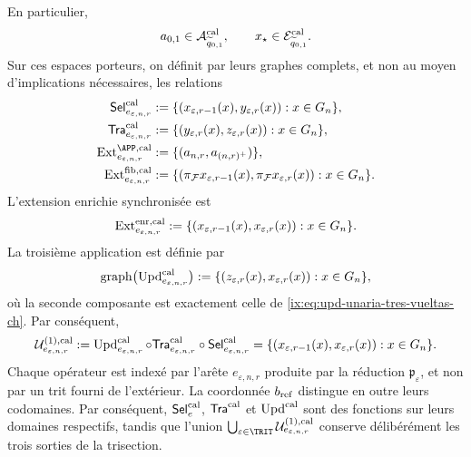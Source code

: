 En particulier,
\[
 a_{0,1}\in\mathcal A^{\rm cal}_{\widetilde q_{0,1}},
 \qquad
 x_\star\in\mathcal E^{\rm cal}_{\widetilde q_{0,1}}.
\]
Sur ces espaces porteurs, on définit par leurs graphes complets, et non au moyen d'implications nécessaires, les relations
\begin{align}
 \mathsf{Sel}^{\rm cal}_{e_{\varepsilon,n,r}}
   &:=\{(x_{\varepsilon,r-1}(x),y_{\varepsilon,r}(x)):
          x\in G_n\},\\
 \mathsf{Tra}^{\rm cal}_{e_{\varepsilon,n,r}}
   &:=\{(y_{\varepsilon,r}(x),z_{\varepsilon,r}(x)):
          x\in G_n\},\\
 \operatorname{Ext}^{\APP,\rm cal}_{e_{\varepsilon,n,r}}
   &:=\{(a_{n,r},a_{(n,r)^+})\},
 \label{ix:eq:ext-app-calibrada-ch}\\
 \operatorname{Ext}^{\rm fib,cal}_{e_{\varepsilon,n,r}}
   &:=\{(\pi_{\mathcal F}x_{\varepsilon,r-1}(x),
          \pi_{\mathcal F}x_{\varepsilon,r}(x)):x\in G_n\}.
 \label{ix:eq:ext-fibra-calibrada-ch}
\end{align}
L'extension enrichie synchronisée est
\begin{equation}
 \operatorname{Ext}^{\rm enr,cal}_{e_{\varepsilon,n,r}}
 :=\{(x_{\varepsilon,r-1}(x),x_{\varepsilon,r}(x)):
       x\in G_n\}.
 \label{ix:eq:ext-enriquecida-calibrada-ch}
\end{equation}
La troisième application est définie par
\begin{equation}
 \operatorname{graph}
 \bigl(\operatorname{Upd}^{\rm cal}_{e_{\varepsilon,n,r}}\bigr)
 :=\{(z_{\varepsilon,r}(x),x_{\varepsilon,r}(x)):
       x\in G_n\},
 \label{ix:eq:grafo-upd-calibrado-ch}
\end{equation}
où la seconde composante est exactement celle de
\eqref{ix:eq:upd-unaria-tres-vueltas-ch}. Par conséquent,
\begin{equation}
 \mathcal U^{(1),\rm cal}_{e_{\varepsilon,n,r}}
 :=\operatorname{Upd}^{\rm cal}_{e_{\varepsilon,n,r}}\circ
   \mathsf{Tra}^{\rm cal}_{e_{\varepsilon,n,r}}\circ
   \mathsf{Sel}^{\rm cal}_{e_{\varepsilon,n,r}}
 =\{(x_{\varepsilon,r-1}(x),x_{\varepsilon,r}(x)):
      x\in G_n\}.
 \label{ix:eq:transicion-cal-en-tpk-ch}
\end{equation}
Chaque opérateur est indexé par l’arête
\(e_{\varepsilon,n,r}\) produite par la réduction
\(\mathfrak p_\varepsilon\), et non par un trit fourni de l’extérieur. La
coordonnée \(b_{\rm ref}\) distingue en outre leurs codomaines. Par conséquent,
\(\mathsf{Sel}^{\rm cal}_{e}\),
\(\mathsf{Tra}^{\rm cal}\) et \(\operatorname{Upd}^{\rm cal}\) sont des fonctions
sur leurs domaines respectifs, tandis que
l’union
\(\bigcup_{\varepsilon\in\TRIT}
\mathcal U^{(1),\rm cal}_{e_{\varepsilon,n,r}}\) conserve délibérément
les trois sorties de la trisection.

